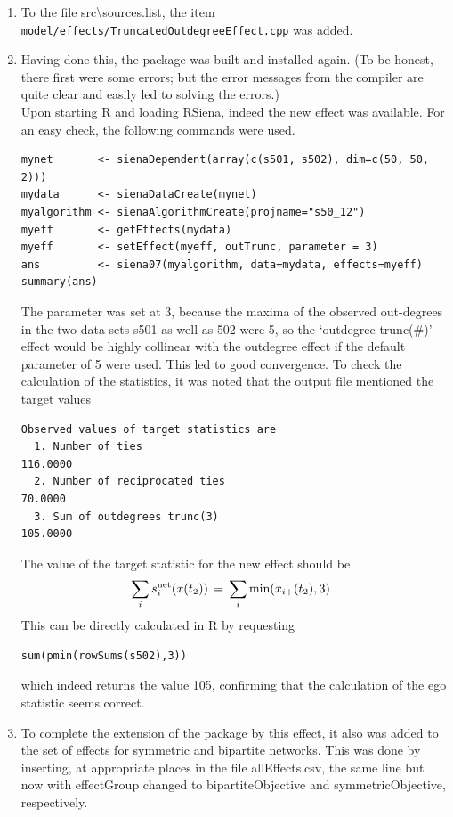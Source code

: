 \documentclass[a4paper,fleqn,11pt]{article}
\newcommand{\+}{\, + \,}
\newcommand{\sfn}[1]{\textsf{#1}}
\newcommand{\R}{{\sf R }}
\newcommand{\rs}{{\sf RSiena}}
\begin{document}
\begin{enumerate}
\item To the file \textsf{src{\textbackslash}sources.list}, the item
      \texttt{model/effects/TruncatedOutdegreeEffect.cpp} was added.
\item Having done this, the package was built and installed again.
      (To be honest, there first were some errors; but the error messages
       from the compiler are quite clear and easily led to solving
       the errors.)\\
      Upon starting \R and loading \rs, indeed the new effect  was
      available. For an easy check, the following commands
      were used.
{\small
\begin{verbatim}
mynet       <- sienaDependent(array(c(s501, s502), dim=c(50, 50, 2)))
mydata      <- sienaDataCreate(mynet)
myalgorithm <- sienaAlgorithmCreate(projname="s50_12")
myeff       <- getEffects(mydata)
myeff       <- setEffect(myeff, outTrunc, parameter = 3)
ans         <- siena07(myalgorithm, data=mydata, effects=myeff)
summary(ans)
\end{verbatim}
}
      The parameter was set at 3, because the maxima of the
      observed out-degrees
      in the two data sets \sfn{s501} as well as \sfn{502} were 5,
      so the `outdegree-trunc(\#)' effect would be highly collinear with the
      outdegree effect if the default parameter of 5 were used.
      This led to good convergence. To check the calculation of the
      statistics, it was noted that the output file
      mentioned the target values
{\small
\begin{verbatim}
Observed values of target statistics are
  1. Number of ties                                           116.0000
  2. Number of reciprocated ties                               70.0000
  3. Sum of outdegrees trunc(3)                               105.0000
\end{verbatim}
}
      The value of the target statistic for the new effect should be
      \[
       \sum_i s^{\rm net}_{i}(x(t_2)) \,=\,
                         \sum_i \text{min}(x_{i+}(t_2), 3) \ .
      \]
      This can be directly calculated in \R by requesting
\begin{verbatim}
sum(pmin(rowSums(s502),3))
\end{verbatim}
      which indeed returns the value 105, confirming that the calculation
      of the ego statistic seems correct.
\item To complete the extension of the package by this effect,
      it also was added to the set of effects for symmetric
      and bipartite networks.
      This was done by inserting, at appropriate places in the file
      \sfn{allEffects.csv},
      the same line but now with \sfn{effectGroup}
      changed to \sfn{bipartiteObjective} and \sfn{symmetricObjective},
      respectively.
\end{enumerate}
\end{document}
